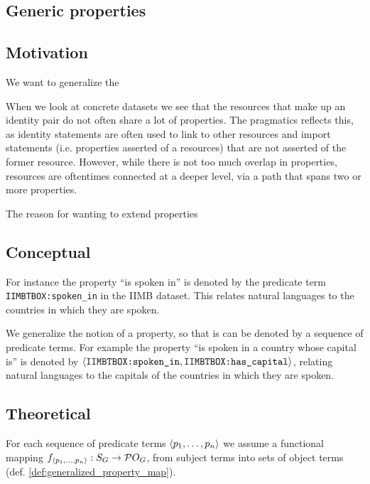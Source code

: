 \subsection{Generic properties}
\label{sec:generic_properties}

\subsection{Motivation}

We want to generalize the 

When we look at concrete datasets we see that the resources that make up
  an identity pair do not often share a lot of properties.
The pragmatics reflects this, as identity statements are often used
  to link to other resources and import statements
  (i.e. properties asserted of a resources)
  that are not asserted of the former resource.
However, while there is not too much overlap in properties,
  resources are oftentimes connected at a deeper level,
  via a path that spans two or more properties.

The reason for wanting to extend properties 

\subsection{Conceptual}

For instance the property ``is spoken in'' is denoted by
  the predicate term \verb|IIMBTBOX:spoken_in| in the IIMB dataset.
This relates natural languages to the countries in which they are spoken.

We generalize the notion of a property,
  so that is can be denoted by a sequence of predicate terms.
For example the property ``is spoken in a country whose capital is''
  is denoted by
  $\langle\texttt{IIMBTBOX:spoken\_in},\texttt{IIMBTBOX:has\_capital}\rangle$,
  relating natural languages to the capitals of the countries in which
  they are spoken.

\subsection{Theoretical}

For each sequence of predicate terms $\langle p_1,\ldots,p_n\rangle$
  we assume a functional mapping
  $f_{\langle p_1,\ldots,p_n\rangle} : S_G \rightarrow \mathcal{P}{O_G}$,
  from subject terms into sets of object terms
  (def. \ref{def:generalized_property_map}).


